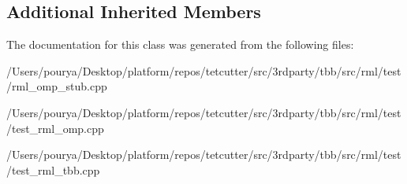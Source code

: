 \subsection*{Additional Inherited Members}


The documentation for this class was generated from the following files\+:\begin{DoxyCompactItemize}
\item 
/\+Users/pourya/\+Desktop/platform/repos/tetcutter/src/3rdparty/tbb/src/rml/test/rml\+\_\+omp\+\_\+stub.\+cpp\item 
/\+Users/pourya/\+Desktop/platform/repos/tetcutter/src/3rdparty/tbb/src/rml/test/test\+\_\+rml\+\_\+omp.\+cpp\item 
/\+Users/pourya/\+Desktop/platform/repos/tetcutter/src/3rdparty/tbb/src/rml/test/test\+\_\+rml\+\_\+tbb.\+cpp\end{DoxyCompactItemize}
